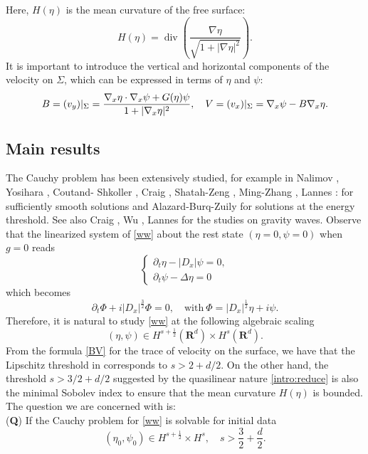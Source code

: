 \documentclass[11pt,english]{smfart}
\theoremstyle{plain}
\theoremstyle{definition}
\numberwithin{equation}{section}
\begin{document}
Here, $H(\eta)$ is the mean curvature of the free surface:
\[
H(\eta)=\operatorname{div}\left( \frac{\nabla\eta}{\sqrt{1+|\nabla\eta|^2}}\right).
\]
It is important to introduce the vertical and horizontal components of the velocity on $\Sigma$, which can be expressed in terms of $\eta$ and $\psi$:
\begin{equation}\label{BV}
B = (v_y)\arrowvert_\Sigma = \frac{ \nabla_x \eta \cdot \nabla_x \psi + G(\eta)\psi} {1+ \vert \nabla_x \eta \vert^2},\quad V= (v_x)\arrowvert_\Sigma  =\nabla_x \psi - B \nabla_x \eta.
 \end{equation}
\subsection{Main results}
The Cauchy problem has been extensively studied, for example in Nalimov \cite{Nalimov}, Yosihara \cite{Yosihara},  Coutand- Shkoller \cite{CS}, Craig \cite{Craig1985}, Shatah-Zeng \cite{SZ1, SZ2, SZ3},  Ming-Zhang \cite{MiZh},  Lannes \cite{LannesLivre}: for sufficiently smooth solutions and  Alazard-Burq-Zuily \cite{ABZ1} for solutions at the energy threshold. See also Craig \cite{Craig1985}, Wu \cite{WuInvent, WuJAMS}, Lannes \cite{LannesJAMS} for the studies on gravity waves. Observe that the linearized system of \eqref{ww} about the rest state $(\eta=0, \psi=0)$ when $g=0$ reads
\[
\begin{cases}
\partial_t\eta-|D_x|\psi=0,\\
\partial_t\psi-\Delta \eta=0
\end{cases}
\]
which becomes 
\begin{equation}\label{eq:lin}
\partial_t\Phi +i|D_x|^{\frac{3}{2}} \Phi=0,\quad\text{with}~\Phi=|D_x|^{\frac{1}{2}}\eta+i\psi.
\end{equation}
Therefore, it is natural to study \eqref{ww} at the following algebraic scaling
\[
(\eta, \psi)\in H^{s+{\frac{1}{2}}}({\mathbf{R}}^d)\times H^s({\mathbf{R}}^d).
\]
From the formula \eqref{BV} for the trace of velocity on the surface, we have that the Lipschitz threshold in \cite{ABZ1} corresponds to $s> 2+d/2.$  On the other hand, the threshold $s>3/2+d/2$ suggested by the quasilinear nature \eqref{intro:reduce} is also the minimal Sobolev index to ensure that the mean curvature  $H(\eta)$ is bounded. The question we are concerned with is:\\
{\hspace*{.15in}} ({\bf Q}) If the Cauchy problem for \eqref{ww} is solvable for initial data 
\begin{equation}\label{intro:data}
(\eta_0, \psi_0)\in H^{s+{\frac{1}{2}}}\times H^s,\quad s>{\frac{3}{2}}+\frac d2.
\end{equation}
\end{document}
